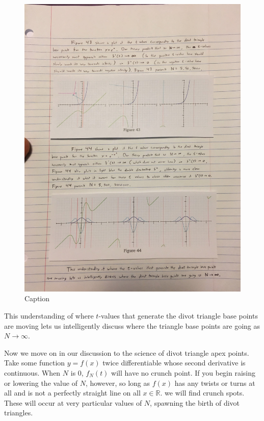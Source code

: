 \begin{figure}[H]
    \centering
    \begin{minipage}[b]{0.9\linewidth}
        \includegraphics[width=.9\linewidth, height=.25\textheight, keepaspectratio]{solving-divot-paths-img/Fig 12-44.png}
        \caption{Caption}
        \label{fig:fig12-44}
    \end{minipage}
\end{figure}

This understanding of where $t$-values that generate the divot triangle base points are moving lets us intelligently discuss where the triangle base points are going as $N \xrightarrow{} \infty$.

Now we move on in our discussion to the science of divot triangle apex points. Take some function $y = f(x)$ twice differentiable whose second derivative is continuous.  When $N$ is 0, $f_N(t)$ will have no crunch point. If you begin raising or lowering the value of $N$, however, so long as $f(x)$ has any twists or turns at all and is not a perfectly straight line on all $x \in \mathbb{R}$. we will find crunch spots. These will occur at very particular values of $N$, spawning the birth of divot triangles.

